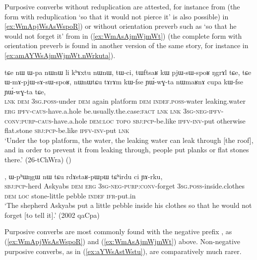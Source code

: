 Purposive converbs without reduplication are attested, for instance  from  (the form with reduplication  `so that it would not pierce it' is also possible) in \ref{ex:WmApjWsAsWspoR}) or without orientation preverb such as  `so that he would not forget it' from  in (\ref{ex:WmAsAjmWjmWt}) (the complete form with orientation preverb is found in another version of the same story, for instance in \ref{ex:amAYWsAjmWjmWt.nWrkuta}).


\begin{exe}
\ex \label{ex:WmApjWsAsWspoR}
\gll  tɕe nɯ ɯ-pa nɯnɯ li kʰɤxtu nɯnɯ, tɯ-ci, tɯftsaʁ kɯ pjɯ-sɯ-spoʁ ŋgrɤl tɕe, tɕe ɯ-mɤ-pjɯ-sɤ-sɯ-spoʁ, nɯnɯtɕu tɤrɤm kɯ-fse ɲɯ́-wɣ-ta nɯmaʁnɤ cupa kɯ-fse ɲɯ́-wɣ-ta tɕe, \\
\textsc{lnk} \textsc{dem} \textsc{3sg}.\textsc{poss}-under \textsc{dem} again platform \textsc{dem} \textsc{indef}.\textsc{poss}-water leaking.water \textsc{erg} \textsc{ipfv}-\textsc{caus}-have.a.hole be.usually.the.case:\textsc{fact} \textsc{lnk} \textsc{lnk} \textsc{3sg}-\textsc{neg}-\textsc{ipfv}-\textsc{conv}:\textsc{purp}-\textsc{caus}-have.a.hole \textsc{dem}:\textsc{loc}  \textsc{topo} \textsc{sbj}:\textsc{pcp}-be.like \textsc{ipfv}-\textsc{inv}-put otherwise  flat.stone \textsc{sbj}:\textsc{pcp}-be.like \textsc{ipfv}-\textsc{inv}-put \textsc{lnk} \\
\glt `Under the top platform, the water, the leaking water can leak through [the roof], and in order to prevent it from leaking through, people put planks or flat stones there.' (26-tChWra)
()
\end{exe}

\begin{exe}
\ex \label{ex:WmAsAjmWjmWt}
, ɯ-pʰɯŋgɯ nɯ tɕu rdɤstaʁ-pɯpɯ tɕʰirdu ci ɲɤ-rku, \\
 \textsc{sbj}:\textsc{pcp}-herd Askyabs \textsc{dem} \textsc{erg}  \textsc{3sg}-\textsc{neg}-\textsc{purp}:\textsc{conv}-forget \textsc{3sg}.\textsc{poss}-inside.clothes \textsc{dem} \textsc{loc} stone-little pebble \textsc{indef}
 \textsc{ifr}-put.in\\
\glt `The shepherd Askyabs put a little pebble inside his clothes so that he would not forget [to tell it].' (2002 qaCpa)
\end{exe}

Purposive converbs are most commonly found with the negative prefix , as (\ref{ex:WmApjWsAsWspoR}) and (\ref{ex:WmAsAjmWjmWt}) above. Non-negative purposive converbs, as in (\ref{ex:aYWsAstWstu}), are comparatively much rarer.

